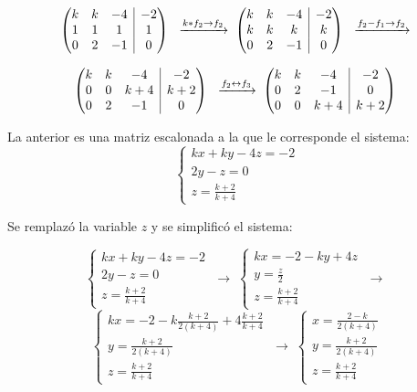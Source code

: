 \documentclass[a4paper,spanish]{article}
\begin{document}
\[
    \begin{array}({@{}ccc|c@{}})
        k & k & -4 & -2 \\
        1 & 1 & 1  & 1  \\
        0 & 2 & -1 & 0
    \end{array}\
    \;
    \xrightarrow{k*f_2 \rightarrow f_2}
    \;
    \begin{array}({@{}ccc|c@{}})
        k & k & -4 & -2 \\
        k & k & k  & k  \\
        0 & 2 & -1 & 0
    \end{array}\
    \;
    \xrightarrow{f_2 - f_1 \rightarrow f_2}
    \;
\]

\[
    \begin{array}({@{}ccc|c@{}})
        k & k & -4  & -2  \\
        0 & 0 & k+4 & k+2 \\
        0 & 2 & -1  & 0
    \end{array}\
    \;
    \xrightarrow{f_2 \leftrightarrow f_3}
    \;
    \begin{array}({@{}ccc|c@{}})
        k & k & -4  & -2  \\
        0 & 2 & -1  & 0   \\
        0 & 0 & k+4 & k+2
    \end{array}\
\]

La anterior es una matriz escalonada a la que le corresponde el sistema:
\[
    \begin{cases}
        kx + ky - 4z = -2 \\
        2y - z = 0        \\
        z = \frac{k+2}{k+4}
    \end{cases}
\]

Se remplazó la variable $z$ y se simplificó el sistema:

\[
    \begin{cases}
        kx + ky - 4z = -2 \\
        2y - z = 0        \\
        z = \frac{k+2}{k+4}
    \end{cases}
    \;
    \rightarrow
    \;
    \begin{cases}
        kx = -2 - ky + 4z \\
        y = \frac{z}{2}   \\
        z = \frac{k+2}{k+4}
    \end{cases}
    \;
    \rightarrow
    \;
\]
\[
    \begin{cases}
        kx  = -2 - k \frac{k+2}{2(k+4)} + 4 \frac{k+2}{k+4} \\
        y = \frac{k+2}{2(k+4)}                              \\
        z = \frac{k+2}{k+4}
    \end{cases}
    \;
    \rightarrow
    \;
    \begin{cases}
        x  = \frac{2-k}{2(k+4)} \\
        y = \frac{k+2}{2(k+4)}  \\
        z = \frac{k+2}{k+4}
    \end{cases}
\]
\end{document}
